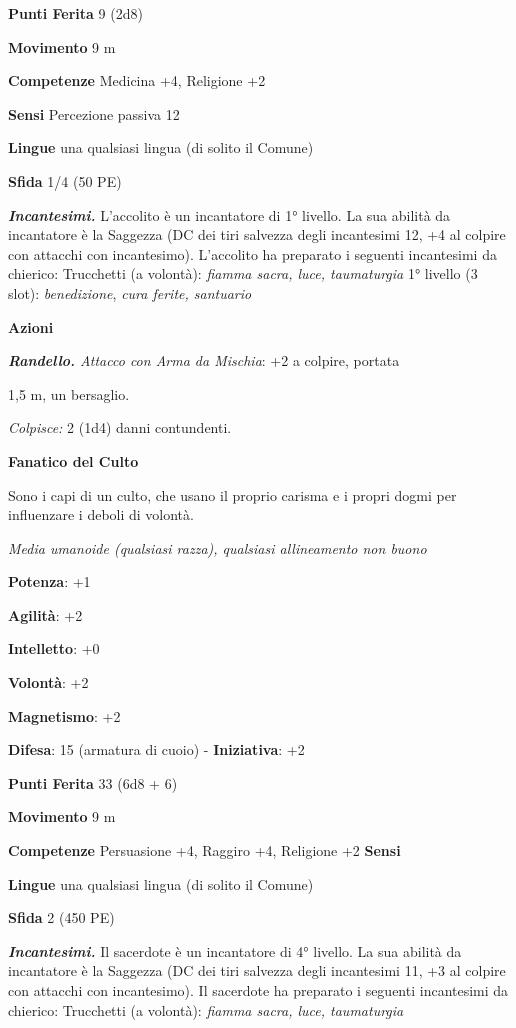 \begin{multicols}{2}
\textbf{Punti Ferita} 9 (2d8)

\textbf{Movimento} 9 m

\textbf{Competenze} Medicina +4, Religione +2

\textbf{Sensi} Percezione passiva 12

\textbf{Lingue} una qualsiasi lingua (di solito il Comune)

\textbf{Sfida} 1/4 (50 PE)\smallskip

\emph{\textbf{Incantesimi.}} L'accolito è un incantatore di 1° livello.
La sua abilità da incantatore è la Saggezza (DC dei tiri salvezza degli
incantesimi 12, +4 al colpire con attacchi con incantesimo). L'accolito
ha preparato i seguenti incantesimi da chierico: Trucchetti (a volontà):
\emph{fiamma sacra, luce, taumaturgia} 1° livello (3 slot):
\emph{benedizione}, \emph{cura ferite, santuario}

\smallskip\textbf{Azioni}


\emph{\textbf{Randello.} Attacco con Arma da Mischia}: +2 a colpire,
portata

1,5 m, un bersaglio.

\emph{Colpisce:} 2 (1d4) danni contundenti.


\textbf{Fanatico del Culto}

Sono i capi di un culto, che usano il proprio carisma e i propri dogmi
per influenzare i deboli di volontà.

\emph{Media umanoide (qualsiasi razza), qualsiasi allineamento non
buono}

\textbf{Potenza}: +1

\textbf{Agilità}: +2

\textbf{Intelletto}: +0

\textbf{Volontà}: +2

\textbf{Magnetismo}: +2

\textbf{Difesa}: 15 (armatura di cuoio) - \textbf{Iniziativa}: +2

\textbf{Punti Ferita} 33 (6d8 + 6)

\textbf{Movimento} 9 m

\textbf{Competenze} Persuasione +4, Raggiro +4, Religione +2 \textbf{Sensi}


\textbf{Lingue} una qualsiasi lingua (di solito il Comune)

\textbf{Sfida} 2 (450 PE)\smallskip

\emph{\textbf{Incantesimi.}} Il sacerdote è un incantatore di 4°
livello. La sua abilità da incantatore è la Saggezza (DC dei tiri
salvezza degli incantesimi 11, +3 al colpire con attacchi con
incantesimo). Il sacerdote ha preparato i seguenti incantesimi da
chierico: Trucchetti (a volontà): \emph{fiamma sacra, luce, taumaturgia}


\end{multicols}
